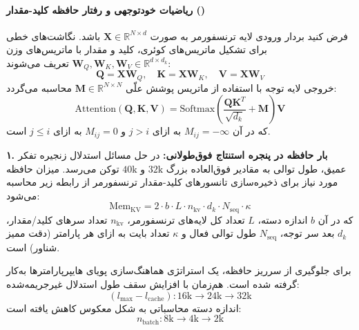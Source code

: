 \paragraph*{ریاضیات خودتوجهی و رفتار حافظه کلید-مقدار ()}
فرض کنید بردار ورودی لایه ترنسفورمر به صورت $\mathbf{X} \in \mathbb{R}^{N \times d}$ باشد. نگاشت‌های خطی برای تشکیل ماتریس‌های کوئری، کلید و مقدار با ماتریس‌های وزن $\mathbf{W}_Q, \mathbf{W}_K, \mathbf{W}_V \in \mathbb{R}^{d \times d_k}$ تعریف می‌شوند:
\begin{equation}
    \mathbf{Q} = \mathbf{X}\mathbf{W}_Q, \quad \mathbf{K} = \mathbf{X}\mathbf{W}_K, \quad \mathbf{V} = \mathbf{X}\mathbf{W}_V
\end{equation}
خروجی لایه توجه با استفاده از ماتریس پوشش علّی $\mathbf{M} \in \mathbb{R}^{N \times N}$ محاسبه می‌گردد:
\begin{equation}
    \text{Attention}(\mathbf{Q}, \mathbf{K}, \mathbf{V}) = \text{Softmax}\left(\frac{\mathbf{Q}\mathbf{K}^T}{\sqrt{d_k}} + \mathbf{M}\right)\mathbf{V}
\end{equation}
که در آن $M_{ij} = -\infty$ به ازای $j > i$ و $M_{ij} = 0$ به ازای $j \le i$ است.

\textbf{۱. بار حافظه  در پنجره استنتاج فوق‌طولانی:}
در حل مسائل استدلال زنجیره تفکر عمیق، طول توالی به مقادیر فوق‌العاده بزرگ $32\text{k}$ و $40\text{k}$ توکن می‌رسد. میزان حافظه مورد نیاز برای ذخیره‌سازی تانسورهای کلید-مقدار ترنسفورمر از رابطه زیر محاسبه می‌شود:
\begin{equation}
    \text{Mem}_{\text{KV}} = 2 \cdot b \cdot L \cdot n_{\text{kv}} \cdot d_k \cdot N_{\text{seq}} \cdot \kappa
\end{equation}
که در آن $b$ اندازه دسته، $L$ تعداد کل لایه‌های ترنسفورمر، $n_{\text{kv}}$ تعداد سرهای کلید/مقدار، $d_k$ بعد سر توجه، $N_{\text{seq}}$ طول توالی فعال و $\kappa$ تعداد بایت به ازای هر پارامتر (دقت ممیز شناور) است.

برای جلوگیری از سرریز حافظه، یک استراتژی هماهنگ‌سازی پویای هایپرپارامترها به‌کار گرفته شده است. هم‌زمان با افزایش سقف طول استدلال غیرجریمه‌شده:
\begin{equation}
    (l_{\max} - l_{\text{cache}}): 16\text{k} \longrightarrow 24\text{k} \longrightarrow 32\text{k}
\end{equation}
اندازه دسته محاسباتی به شکل معکوس کاهش یافته است:
\begin{equation}
    n_{\text{batch}}: 8\text{k} \longrightarrow 4\text{k} \longrightarrow 2\text{k}
\end{equation}

